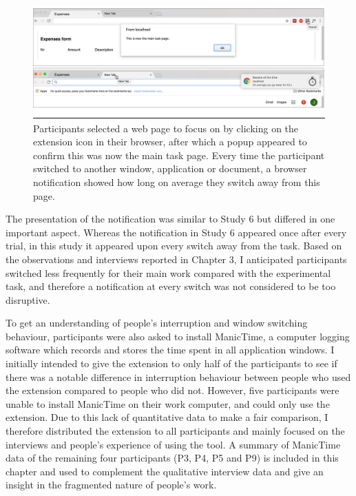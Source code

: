 \begin{figure}
\centering
\centerline{\includegraphics[scale=0.17]{images/ch56/ch56-7_taskinterface.pdf}}
\caption{Participants selected a web page to focus on by clicking on the extension icon in their browser, after which a popup appeared to confirm this was now the main task page. Every time the participant switched to another window, application or document, a browser notification showed how long on average they switch away from this page.}
\label{fig:ch56-7_taskinterface}
\end{figure}

The presentation of the notification was similar to Study 6 but differed in one important aspect. Whereas the notification in Study 6 appeared once after every trial, in this study it appeared upon every switch away from the task. Based on the observations and interviews reported in Chapter 3, I anticipated participants switched less frequently for their main work compared with the experimental task, and therefore a notification at every switch was not considered to be too disruptive.

To get an understanding of people’s interruption and window switching behaviour, participants were also asked to install ManicTime, a computer logging software which records and stores the time spent in all application windows. I initially intended to give the extension to only half of the participants to see if there was a notable difference in interruption behaviour between people who used the extension compared to people who did not. However, five participants were unable to install ManicTime on their work computer, and could only use the extension. Due to this lack of quantitative data to make a fair comparison, I therefore distributed the extension to all participants and mainly focused on the interviews and people’s experience of using the tool. A summary of ManicTime data of the remaining four participants (P3, P4, P5 and P9) is included in this chapter and used to complement the qualitative interview data and give an insight in the fragmented nature of people’s work.

